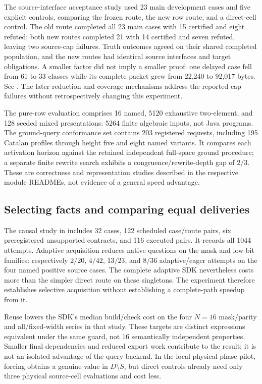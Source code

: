 The source-interface acceptance study used 23 main development cases and five explicit controls, comparing the frozen route, the new row route, and a direct-cell control. The old route completed all 23 main cases with 15 certified and eight refuted; both new routes completed 21 with 14 certified and seven refuted, leaving two source-cap failures. Truth outcomes agreed on their shared completed population, and the new routes had identical source interfaces and target obligations. A smaller factor did not imply a smaller proof: one delayed case fell from 61 to 33 classes while its complete packet grew from 22,240 to 92,017 bytes. See . The later reduction and coverage mechanisms address the reported cap failures without retrospectively changing this experiment.

The pure-row evaluation comprises 16 named, 5120 exhaustive two-element, and 128 seeded mixed presentations: 5264 finite algebraic inputs, not Java programs. The ground-query conformance set contains 203 registered requests, including 195 Catalan profiles through height five and eight named variants. It compares each activation horizon against the retained independent full-space ground procedure; a separate finite rewrite search exhibits a congruence/rewrite-depth gap of $2/3$. These are correctness and representation studies described in the respective module READMEs, not evidence of a general speed advantage.

\subsection{Selecting facts and comparing equal deliveries}
The causal study in  includes 32 cases, 122 scheduled case/route pairs, six preregistered unsupported contracts, and 116 executed pairs. It records all 1044 attempts. Adaptive acquisition reduces native questions on the mask and low-bit families: respectively $2/20$, $4/42$, $13/23$, and $8/36$ adaptive/eager attempts on the four named positive source cases. The complete adaptive SDK nevertheless costs more than the simpler direct route on these singletons. The experiment therefore establishes selective acquisition without establishing a complete-path speedup from it.

Reuse lowers the SDK's median build/check cost on the four $N=16$ mask/parity and all/fixed-width series in that study. These targets are distinct expressions equivalent under the same guard, not 16 semantically independent properties. Smaller final dependencies and reduced export work contribute to the result; it is not an isolated advantage of the query backend. In the local physical-phase pilot, forcing obtains a genuine value in $D\setminus S$, but direct controls already need only three physical source-cell evaluations and cost less.

